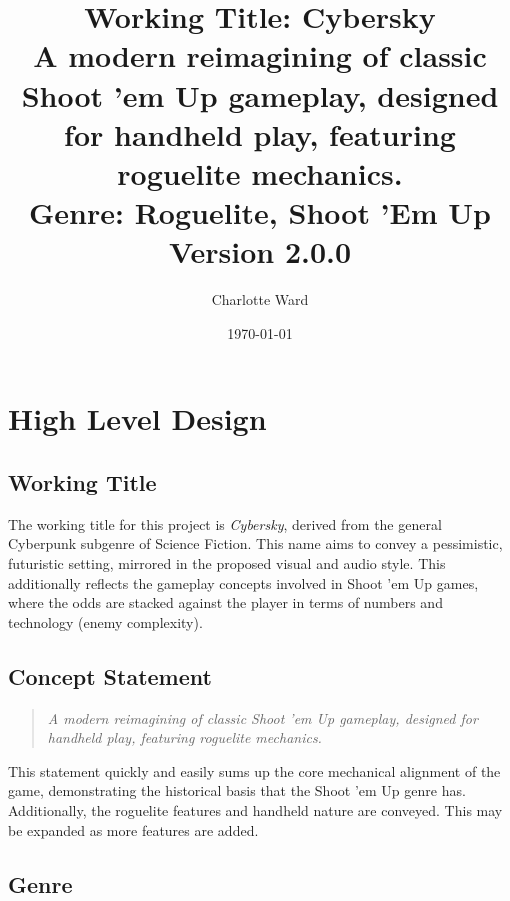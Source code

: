 \documentclass{scrartcl}
\begin{document}
\author{Charlotte Ward}
\date{\today}
\title{
{\huge Working Title: Cybersky} \\
{\small A modern reimagining of classic Shoot 'em Up gameplay, designed for handheld play, featuring roguelite mechanics.} \\
{\small Genre: Roguelite, Shoot 'Em Up} \\
{\small Version 2.0.0}
}
\maketitle

\tableofcontents

\pagebreak

\section{
  High Level Design
 }

\subsection{Working Title}

The working title for this project is \emph{Cybersky}, derived from the general Cyberpunk subgenre of Science Fiction. This name aims to convey a pessimistic, futuristic setting, mirrored in the proposed visual and audio style. This additionally reflects the gameplay concepts involved in Shoot 'em Up games, where the odds are stacked against the player in terms of numbers and technology (enemy complexity).

\subsection{Concept Statement}

\begin{quote}
  \emph{A modern reimagining of classic Shoot 'em Up gameplay, designed for handheld play, featuring roguelite mechanics.}
\end{quote}

This statement quickly and easily sums up the core mechanical alignment of the game, demonstrating the historical basis that the Shoot 'em Up genre has. Additionally, the roguelite features and handheld nature are conveyed. This may be expanded as more features are added.

\subsection{Genre}
\end{document}
